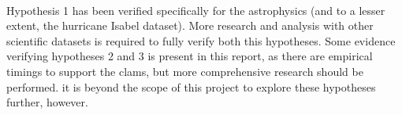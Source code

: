 \paragraph{}

Hypothesis 1 has been verified specifically for the astrophysics (and to a lesser extent, the hurricane Isabel dataset). More research and analysis with other scientific datasets is required to fully verify both this hypotheses. Some evidence verifying hypotheses 2 and 3 is present in this report, as there are empirical timings to support the clams, but more comprehensive research should be performed. it is beyond the scope of this project to explore these hypotheses further, however.